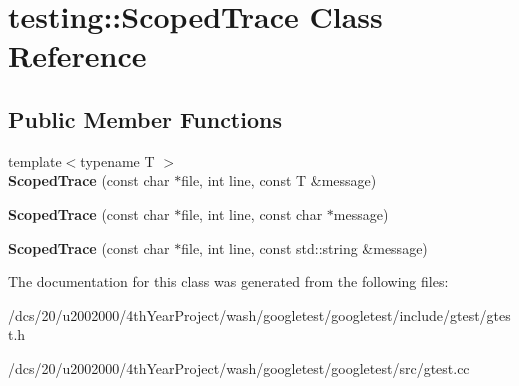 \hypertarget{classtesting_1_1ScopedTrace}{}\section{testing\+:\+:Scoped\+Trace Class Reference}
\label{classtesting_1_1ScopedTrace}
\subsection*{Public Member Functions}
\begin{DoxyCompactItemize}
\item 
\mbox{\label{classtesting_1_1ScopedTrace_a2da90b95d682d518cca472934d53c59c}} 
{\footnotesize template$<$typename T $>$ }\\{\bfseries Scoped\+Trace} (const char $\ast$file, int line, const T \&message)
\item 
\mbox{\label{classtesting_1_1ScopedTrace_accd2a06cc941ffd7d6fe109adfdb4f19}} 
{\bfseries Scoped\+Trace} (const char $\ast$file, int line, const char $\ast$message)
\item 
\mbox{\label{classtesting_1_1ScopedTrace_a1f453a2aade0db6955a111a7cb329615}} 
{\bfseries Scoped\+Trace} (const char $\ast$file, int line, const std\+::string \&message)
\end{DoxyCompactItemize}


The documentation for this class was generated from the following files\+:\begin{DoxyCompactItemize}
\item 
/dcs/20/u2002000/4th\+Year\+Project/wash/googletest/googletest/include/gtest/gtest.\+h\item 
/dcs/20/u2002000/4th\+Year\+Project/wash/googletest/googletest/src/gtest.\+cc\end{DoxyCompactItemize}
